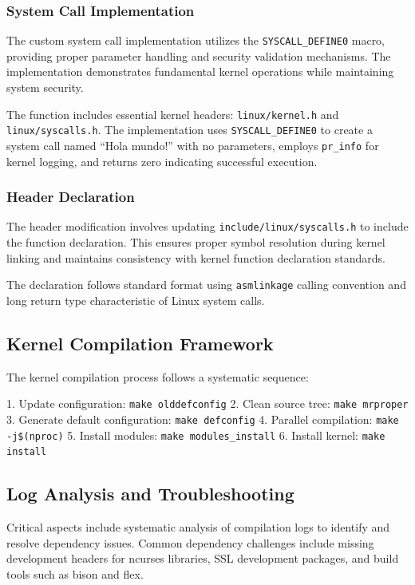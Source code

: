 \documentclass[conference]{IEEEtran}
\begin{document}
\subsubsection{System Call Implementation}

The custom system call implementation utilizes the \texttt{SYSCALL\_DEFINE0} macro, providing proper parameter handling and security validation mechanisms. The implementation demonstrates fundamental kernel operations while maintaining system security.

The function includes essential kernel headers: \texttt{linux/kernel.h} and \texttt{linux/syscalls.h}. The implementation uses \texttt{SYSCALL\_DEFINE0} to create a system call named ``Hola mundo!'' with no parameters, employs \texttt{pr\_info} for kernel logging, and returns zero indicating successful execution.

\subsubsection{Header Declaration}

The header modification involves updating \texttt{include/linux/syscalls.h} to include the function declaration. This ensures proper symbol resolution during kernel linking and maintains consistency with kernel function declaration standards.

The declaration follows standard format using \texttt{asmlinkage} calling convention and long return type characteristic of Linux system calls.

\subsection{Kernel Compilation Framework}

The kernel compilation process follows a systematic sequence:

1. Update configuration: \texttt{make olddefconfig}
2. Clean source tree: \texttt{make mrproper}  
3. Generate default configuration: \texttt{make defconfig}
4. Parallel compilation: \texttt{make -j\$(nproc)}
5. Install modules: \texttt{make modules\_install}
6. Install kernel: \texttt{make install}

\subsection{Log Analysis and Troubleshooting}

Critical aspects include systematic analysis of compilation logs to identify and resolve dependency issues. Common dependency challenges include missing development headers for ncurses libraries, SSL development packages, and build tools such as bison and flex.
\end{document}
